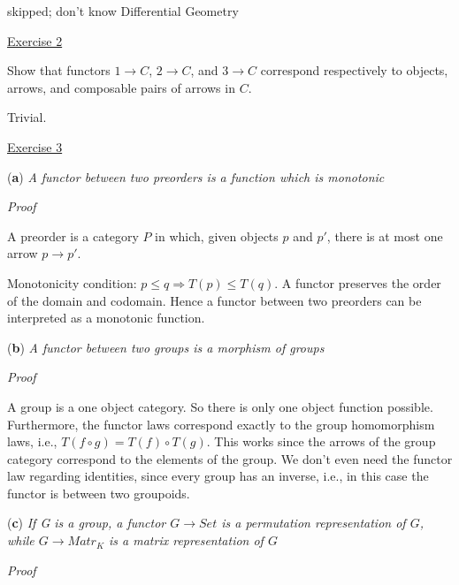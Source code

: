 \documentclass[11pt]{article}
\begin{document}
skipped; don't know Differential Geometry

\vspace{2mm}

\noindent
\underline{Exercise 2}
\vspace{2mm}

Show that functors $1 \rightarrow C$, $2 \rightarrow C$, and $3 \rightarrow C$ correspond respectively to objects, arrows, and composable pairs of arrows in $C$.
\vspace{2mm}

Trivial. 
\vspace{2mm}

\noindent
\underline{Exercise 3}
\vspace{2mm}

(\textbf{a}) \emph{A functor between two preorders is a function which is monotonic}

\vspace{2mm}
\noindent
\emph{Proof}

A preorder is a category $P$ in which, given objects $p$ and $p'$, there is at most one arrow $p \rightarrow p'$.

Monotonicity condition: $p \leq q \Longrightarrow T(p) \leq T(q)$. A functor preserves the order of the domain and codomain. Hence a functor between two preorders can be interpreted as a monotonic function. 

\vspace{2mm}
(\textbf{b}) \emph{A functor between two groups is a morphism of groups}

\vspace{2mm}
\noindent
\emph{Proof}

A group is a one object category. So there is only one object function possible. Furthermore, the functor laws correspond exactly to the group homomorphism laws, i.e., $T(f \circ g) = T(f) \circ T(g)$. This works since the arrows of the group category correspond to the elements of the group. We don't even need the functor law regarding identities, since every group has an inverse, i.e., in this case the functor is between two groupoids. 

\vspace{2mm}
(\textbf{c}) \emph{If G is a group, a functor $G \rightarrow Set$ is a permutation representation
of $G$, while $G \rightarrow Matr_K$ is a matrix representation of $G$}

\vspace{2mm}
\noindent
\emph{Proof}
\end{document}
